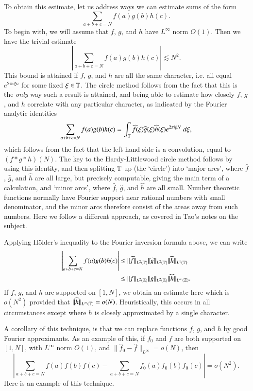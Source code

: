 To obtain this estimate, let us address ways we can estimate sums of the form
%
\[ \sum_{a + b + c = N} f(a) g(b) h(c). \]
%
To begin with, we will assume that $f$, $g$, and $h$ have $L^\infty$ norm $O(1)$. Then we have the trivial estimate
%
\[ \left| \sum_{a + b + c = N} f(a) g(b) h(c) \right| \lesssim N^2. \]
%
This bound is attained if $f$, $g$, and $h$ are all the same character, i.e. all equal $e^{2 \pi i \xi n}$ for some fixed $\xi \in \operatorname{\mathbb{T}}$. The circle method follows from the fact that this is the \emph{only} way such a result is attained, and being able to estimate how closely $f$, $g$, and $h$ correlate with any particular character, as indicated by the Fourier analytic identities
%
\[ \sum_{a + b + c = N} f(a) g(b) h(c) = \int_{\operatorname{\mathbb{T}}} \widehat{f}(\xi) \widehat{g}(\xi) \widehat{h}(\xi) e^{2 \pi i \xi N}\; d\xi, \]
%
which follows from the fact that the left hand side is a convolution, equal to $(f * g * h)(N)$. The key to the Hardy-Littlewood circle method follows by using this identity, and then splitting $\operatorname{\mathbb{T}}$ up (the `circle') into `major arcs', where $\widehat{f}$, $\widehat{g}$, and $\widehat{h}$ are all large, but precisely computable, giving the main term of a calculation, and `minor arcs', where $\widehat{f}$, $\widehat{g}$, and $\widehat{h}$ are all small. Number theoretic functions normally have Fourier support near rational numbers with small denominator, and the minor arcs therefore consist of the areas away from such numbers. Here we follow a different approach, as covered in Tao's notes on the subject.

Applying H\"{o}lder's inequality to the Fourier inversion formula above, we can write
%
\begin{align*}
    \left| \sum_{a + b + c = N} f(a) g(b) h(c) \right| &\leq \| \widehat{f} \|_{L^2(\operatorname{\mathbb{T}})} \| \widehat{g} \|_{L^2(\operatorname{\mathbb{T}})} \| \widehat{h} \|_{L^1(\operatorname{\mathbb{T}})}\\
    &\leq \| f \|_{L^2(\operatorname{\mathbb{Z}})} \| g \|_{L^2(\operatorname{\mathbb{Z}})} \| \widehat{h} \|_{L^\infty(\operatorname{\mathbb{Z}})}.
\end{align*}
%
If $f$, $g$, and $h$ are supported on $[1,N]$, we obtain an estimate here which is $o(N^2)$ provided that $\| \widehat{h} \|_{L^\infty(\operatorname{\mathbb{T}})} = o(N)$. Heuristically, this occurs in all circumstances except where $h$ is closely approximated by a single character.

A corollary of this technique, is that we can replace functions $f$, $g$, and $h$ by good Fourier approximants. As an example of this, if $f_0$ and $f$ are both supported on $[1,N]$, with $L^\infty$ norm $O(1)$, and $\| \widehat{f}_0 - \widehat{f} \|_{L^\infty} = o(N)$, then
%
\[ \left| \sum_{a + b + c = N} f(a) f(b) f(c) - \sum_{a + b + c = N} f_0(a) f_0(b) f_0(c) \right| = o(N^2). \]
%
Here is an example of this technique.

